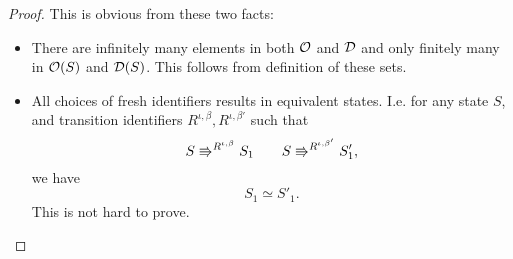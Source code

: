 \begin{proof}
  This is obvious from these two facts:
  \begin{itemize}
    \item There are infinitely many elements in both $\mathcal{O}$ and $\mathcal{D}$ and
      only finitely many in $\mathcal{O}(S)$ and $\mathcal{D}(S)$. This follows from
      definition of these sets.
    \item All choices of fresh identifiers results in equivalent states. I.e.
      for any state $S$, and transition identifiers $R^{\iota, \beta},
      R^{\iota, \beta'}$ such that 
      \begin{equation*}
        S \Rrightarrow^{R^{\iota, \beta}} S_1 \quad\quad S
        \Rrightarrow^{R^{\iota, \beta'}} S'_1,
      \end{equation*}
      we have
      \begin{equation*}
        S_1 \simeq S'_1.
      \end{equation*}
      This is not hard to prove.
  \end{itemize}
\end{proof}

